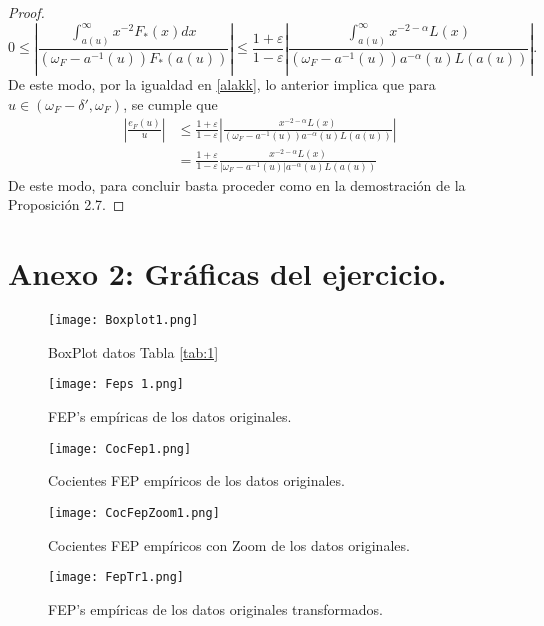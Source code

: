 \documentclass[10.5pt,notitlepage]{article}
\newcommand{\ee}{\varepsilon}
\newcommand{\abs}[1]{\left\lvert #1 \right\rvert}
\newcommand{\pare}[1]{\left( #1 \right)}
\theoremstyle{plain}
\begin{document}
\begin{proof}
\[
0\leq \abs{\frac{\int_{a(u)}^{\infty}x^{-2}F_{*}(x)dx}{ \pare{\omega_{F} - a^{-1}(u)}F_{*}(a(u))}}  \leq \frac{1 +\ee}{1-\ee}\abs{\frac{\int_{a(u)}^{\infty}x^{-2-\alpha}L(x)}{\pare{\omega_{F} - a^{-1}(u)}a^{-\alpha}(u)L(a(u))}}.
\]
De este modo, por la igualdad en \eqref{alakk}, lo anterior implica que para \(u \in (\omega_{F} -\delta',\omega_{F})\), se cumple que 
\begin{align*}
\abs{\frac{e_{F}(u)}{u}}&\leq \frac{1 +\ee}{1-\ee}\abs{\frac{x^{-2-\alpha}L(x)}{\pare{\omega_{F} - a^{-1}(u)}a^{-\alpha}(u)L(a(u))}}\\
                        &= \frac{1 +\ee}{1-\ee}\frac{x^{-2-\alpha}L(x)}{\abs{\omega_{F} - a^{-1}(u)}a^{-\alpha}(u)L(a(u))}
\end{align*}
De este modo, para concluir basta proceder como en la demostración de la Proposición 2.7.

\end{proof}






\section{Anexo 2: Gráficas del ejercicio.}
\begin{figure}[htb]
    \centering
    \texttt{[image: Boxplot1.png]}
    \caption{BoxPlot datos Tabla \ref{tab:1}}
    \label{fig:1}
\end{figure}

\begin{figure}[htb]
    \centering
    \texttt{[image: Feps 1.png]}
    \caption{FEP's empíricas de los datos originales.}
    \label{fig:2}
\end{figure}

\begin{figure}[htb]
    \centering
    \texttt{[image: CocFep1.png]}
    \caption{Cocientes FEP empíricos de los datos originales.}
    \label{fig:3}
\end{figure}

\begin{figure}[htb]
    \centering
    \texttt{[image: CocFepZoom1.png]}
    \caption{Cocientes FEP empíricos con Zoom de los datos originales.}
    \label{fig:4}
\end{figure}

\begin{figure}[htb]
    \centering
    \texttt{[image: FepTr1.png]}
    \caption{FEP's empíricas de los datos originales transformados.}
    \label{fig:5}
\end{figure}
\end{document}
